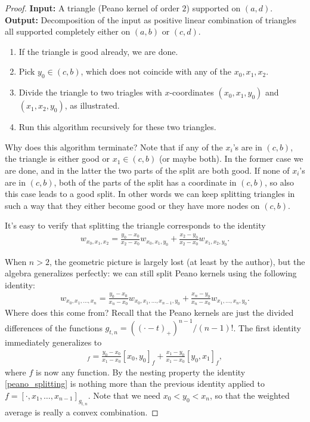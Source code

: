 \begin{proof}
	\noindent \textbf{Input:} A triangle (Peano kernel of order $2$) supported on $(a, d)$. \\
	\noindent \textbf{Output:} Decomposition of the input as positive linear combination of triangles all supported completely either on $(a, b)$ or $(c, d)$.
	\begin{enumerate}
		\item If the triangle is good already, we are done.
		\item Pick $y_{0} \in (c, b)$, which does not coincide with any of the $x_{0}, x_{1}, x_{2}$.
		\item Divide the triangle to two triagles with $x$-coordinates $(x_{0}, x_{1}, y_{0})$ and $(x_{1}, x_{2},  y_{0})$, as illustrated.
		\item Run this algorithm recursively for these two triangles.
	\end{enumerate}
	Why does this algorithm terminate? Note that if any of the $x_{i}$'s are in $(c, b)$, the triangle is either good or $x_{1} \in (c, b)$ (or maybe both). In the former case we are done, and in the latter the two parts of the split are both good. If none of $x_{i}$'s are in $(c, b)$, both of the parts of the split has a coordinate in $(c, b)$, so also this case leads to a good split. In other words we can keep splitting triangles in such a way that they either become good or they have more nodes on $(c, b)$.

	It's easy to verify that splitting the triangle corresponds to the identity
	\begin{align*}
		w_{x_{0}, x_{1}, x_{2}} = \frac{y_{0} - x_{0}}{x_{2} - x_{0}} w_{x_{0}, x_{1}, y_{0}} + \frac{x_{2} - y_{0}}{x_{2} - x_{0}} w_{x_{1}, x_{2}, y_{0}}.
	\end{align*}

	When $n > 2$, the geometric picture is largely lost (at least by the author), but the algebra generalizes perfectly: we can still split Peano kernels using the following identity:
	\begin{align}\label{peano_splitting}
		w_{x_{0}, x_{1}, \ldots, x_{n}} = \frac{y_{0} - x_{0}}{x_{n} - x_{0}} w_{x_{0}, x_{1}, \ldots, x_{n - 1}, y_{0}} + \frac{x_{n} - y_{0}}{x_{n} - x_{0}} w_{x_{1}, \ldots, x_{n}, y_{0}}.
	\end{align}
	Where does this come from? Recall that the Peano kernels are just the divided differences of the functions $g_{t, n} = ((\cdot - t)_{+})^{n - 1}/(n - 1)!$. The first identity immediately generalizes to
	\begin{align*}
		[x_{0}, x_{1}]_{f} = \frac{y_{0} - x_{0}}{x_{1} - x_{0}} [x_{0}, y_{0}]_{f} + \frac{x_{1} - y_{0}}{x_{1} - x_{0}} [y_{0}, x_{1}]_{f},
	\end{align*}
	where $f$ is now any function. By the nesting property the identity \ref{peano_splitting} is nothing more than the previous identity applied to $f = [\cdot, x_{1}, \ldots, x_{n - 1}]_{g_{t, n}}$. Note that we need $x_{0} < y_{0} < x_{n}$, so that the weighted average is really a convex combination.


\end{proof}
